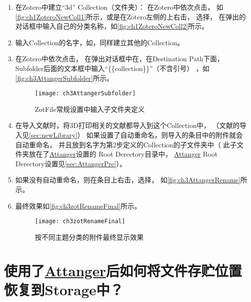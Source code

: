 \documentclass[theorem=false,mathfont=none,openany,sub3section]{easybook}
\begin{document}
\begin{enumerate}
	\item 在Zotero中建立“3d” Collection（文件夹）：
	在Zotero中依次点击，
	如\autoref{fig:ch1ZoteroNewColl1}所示，或是在Zotero左侧的上右击，
	选择，
	在弹出的对话框中输入自己的分类名称，如\autoref{fig:ch1ZoteroNewColl2}所示。

	\item 输入Collection的名字，如，同样建立其他的Collection。
	
 
	\item 	在Zotero中依次点击，
	在弹出对话框中在，在Destination Path下面，Subfolder后面的文本框中输入“\{\{collection\}\}”（不含引号）
	，如\autoref{fig:ch3AttangerSubfolder}所示。
	
 	\begin{figure}[htbp]
		\centering
		\texttt{[image: ch3AttangerSubfolder]}
		\caption{ZotFile常规设置中输入子文件夹定义}
		\label{fig:ch3AttangerSubfolder}
	\end{figure}
	\item 在导入文献时，将3D打印相关的文献都导入到这个Collection中，
	（文献的导入见\cref{sec:newLibrary}）
	如果设置了自动重命名，则导入的条目中的附件就会自动重命名，
	并且放到名字为第2步定义的Collection的子文件夹中（
	此子文件夹放在了\href{https://github.com/MuiseDestiny/zotero-attanger}{Attanger}设置的
	Root Derectory目录中，
	\href{https://github.com/MuiseDestiny/zotero-attanger}{Attanger} Root Derectory设置见\cref{sec:AttangerPre}）。
	
	\item 如果没有自动重命名，则在条目上右击，选择，
	如\autoref{fig:ch3AttangerRename}所示。	
	\item 最终效果如\autoref{fig:ch3zotRenameFinal}所示。
 
	\begin{figure}[htbp]
		\centering
		\texttt{[image: ch3zotRenameFinal]}
		\caption{按不同主题分类的附件最终显示效果}
		\label{fig:ch3zotRenameFinal}
	\end{figure}	
\end{enumerate}

\section{使用了\href{https://github.com/MuiseDestiny/zotero-attanger}{Attanger}后如何将文件存贮位置恢复到Storage中？}\label{sec:zotFile_restore_storage}
\end{document}
